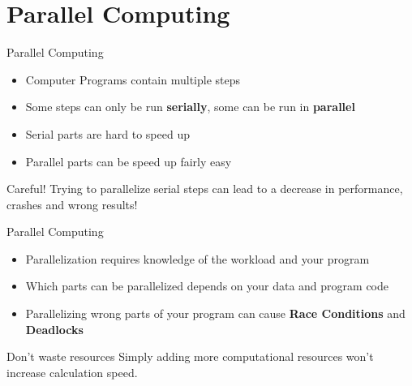 \documentclass{beamer}
\begin{document}
\section{Parallel Computing}
\begin{frame}{Parallel Computing}
\begin{itemize}
	\item Computer Programs contain multiple steps
	\item Some steps can only be run \textbf{serially}, some can be run in \textbf{parallel}
	\item Serial parts are hard to speed up
	\item  Parallel parts can be speed up fairly easy
\end{itemize}




\begin{alertblock}{Careful!}
	Trying to parallelize serial steps can lead to a decrease in performance, crashes and wrong results!
\end{alertblock}

\end{frame}
\begin{frame}{Parallel Computing}
	\begin{itemize}
	\item Parallelization requires knowledge of the workload and your program
	\item Which parts can be parallelized depends on your data and program code
	\item Parallelizing wrong parts of your program can cause \textbf{Race Conditions} and \textbf{Deadlocks}		
\end{itemize}



\begin{block}{Don't waste resources}
Simply adding more computational resources won't increase calculation speed.
\end{block}
\end{frame}

\end{document}
